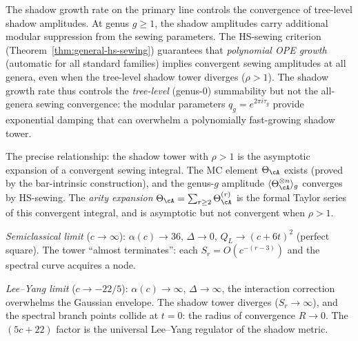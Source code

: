 \begin{remark}
\label{rem:sewing-convergence-shadow-radius}
The shadow growth rate on the primary line controls
the convergence of tree-level shadow amplitudes.
At genus $g \geq 1$, the shadow amplitudes carry
additional modular suppression from the sewing
parameters.  The HS-sewing criterion
\textup{(}Theorem~\textup{\ref{thm:general-hs-sewing})}
guarantees that \emph{polynomial OPE growth}
(automatic for all standard families) implies
convergent sewing amplitudes at all genera, even
when the tree-level shadow tower diverges
($\rho > 1$).  The shadow growth rate thus controls
the \emph{tree-level} (genus-$0$) summability but
not the all-genera sewing convergence: the modular
parameters $q_g = e^{2\pi i \tau_g}$ provide
exponential damping that can overwhelm a polynomially
fast-growing shadow tower.

The precise relationship: the shadow tower with
$\rho > 1$ is the asymptotic expansion of a convergent
sewing integral.  The MC element $\Theta_\cA$ exists
(proved by the bar-intrinsic construction), and the
genus-$g$ amplitude
$\langle \Theta_\cA^{\otimes n} \rangle_g$
converges by HS-sewing.  The \emph{arity expansion}
$\Theta_\cA = \sum_{r \geq 2} \Theta_\cA^{(r)}$
is the formal Taylor series of this convergent
integral, and is asymptotic but not convergent
when $\rho > 1$.
\end{remark}

\begin{remark}
\label{rem:shadow-limits}
\emph{Semiclassical limit} ($c \to \infty$): $\alpha(c) \to 36$, $\Delta \to 0$, $Q_L \to (c{+}6t)^2$ (perfect square).  The tower ``almost terminates'': each $S_r = O(c^{-(r-3)})$ and the spectral curve acquires a node.

\emph{Lee--Yang limit} ($c \to -22/5$): $\alpha(c) \to \infty$, $\Delta \to \infty$, the interaction correction overwhelms the Gaussian envelope.  The shadow tower diverges ($S_r \to \infty$), and the spectral branch points collide at $t = 0$: the radius of convergence $R \to 0$.  The $(5c{+}22)$ factor is the universal Lee--Yang regulator of the shadow metric.
\end{remark}

